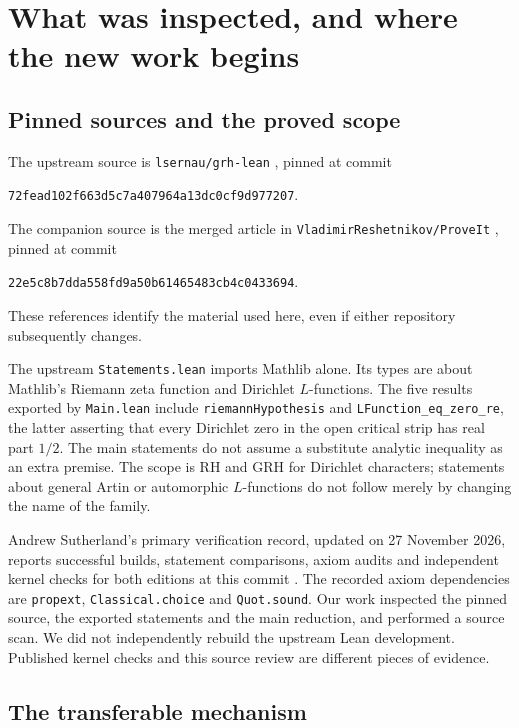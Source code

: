 \section{What was inspected, and where the new work begins}

\subsection{Pinned sources and the proved scope}

The upstream source is \texttt{lsernau/grh-lean} \cite{GRHLean},
pinned at commit
\begin{center}
\texttt{72fead102f663d5c7a407964a13dc0cf9d977207}.
\end{center}
The companion source is the merged article in
\texttt{VladimirReshetnikov/ProveIt} \cite{ProveItArticle}, pinned at commit
\begin{center}
\texttt{22e5c8b7dda558fd9a50b61465483cb4c0433694}.
\end{center}
These references identify the material used here, even if either
repository subsequently changes.

The upstream \texttt{Statements.lean} imports Mathlib alone. Its types
are about Mathlib's Riemann zeta function and Dirichlet $L$-functions.
The five results exported by \texttt{Main.lean} include
\texttt{riemannHypothesis} and
\texttt{LFunction\_eq\_zero\_re}, the latter asserting that every
Dirichlet zero in the open critical strip has real part $1/2$.
The main statements do not assume a substitute analytic inequality as an
extra premise. The scope is RH and GRH for Dirichlet characters; statements
about general Artin or automorphic $L$-functions do not follow merely by
changing the name of the family.

Andrew Sutherland's primary verification record, updated on 27 November
2026, reports successful builds, statement comparisons, axiom audits and
independent kernel checks for both editions at this commit
\cite{Sutherland2026}. The recorded axiom dependencies are
\texttt{propext}, \texttt{Classical.choice} and \texttt{Quot.sound}.
Our work inspected the pinned source, the exported statements and the
main reduction, and performed a source scan. We did not independently
rebuild the upstream Lean development. Published kernel checks and this
source review are different pieces of evidence.

\subsection{The transferable mechanism}

